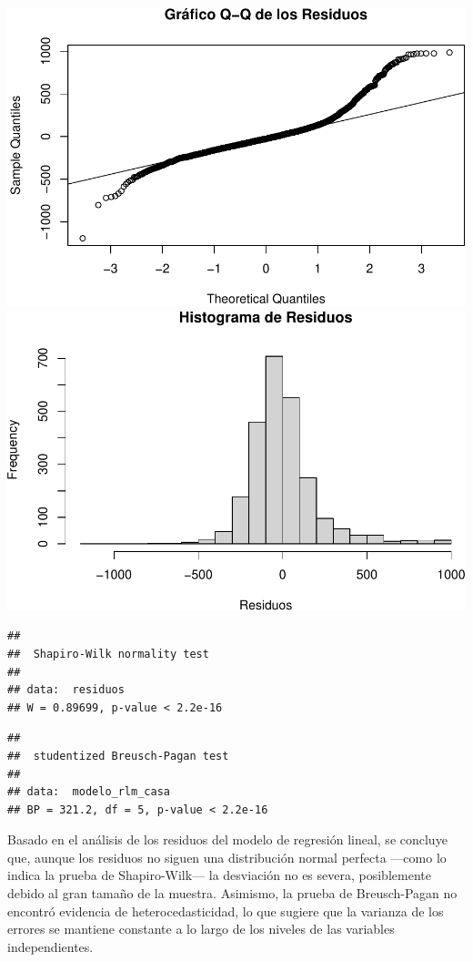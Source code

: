 \documentclass[
]{article}
\begin{document}
\includegraphics{A2_U2_InformeEjecutivo_files/figure-latex/unnamed-chunk-21-1.pdf}
\includegraphics{A2_U2_InformeEjecutivo_files/figure-latex/unnamed-chunk-21-2.pdf}

\begin{verbatim}
## 
##  Shapiro-Wilk normality test
## 
## data:  residuos
## W = 0.89699, p-value < 2.2e-16
\end{verbatim}

\begin{verbatim}
## 
##  studentized Breusch-Pagan test
## 
## data:  modelo_rlm_casa
## BP = 321.2, df = 5, p-value < 2.2e-16
\end{verbatim}

Basado en el análisis de los residuos del modelo de regresión lineal, se
concluye que, aunque los residuos no siguen una distribución normal
perfecta ---como lo indica la prueba de Shapiro-Wilk--- la desviación no
es severa, posiblemente debido al gran tamaño de la muestra. Asimismo,
la prueba de Breusch-Pagan no encontró evidencia de heterocedasticidad,
lo que sugiere que la varianza de los errores se mantiene constante a lo
largo de los niveles de las variables independientes.
\end{document}
